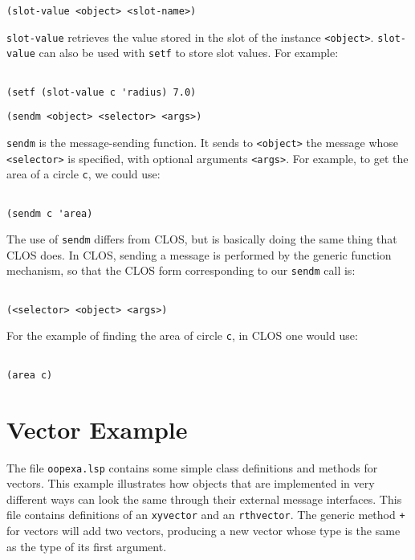 \vspace{.3in}

\begin{verbatim}
(slot-value <object> <slot-name>)
\end{verbatim}
{\tt slot-value} retrieves the value stored in the slot {\tt <slot-name>} of
the instance {\tt <object>}.  {\tt slot-value} can also be used with {\tt setf}
to store slot values.  For example:
\begin{verbatim}

(setf (slot-value c 'radius) 7.0)
\end{verbatim}

\vspace{.3in}

\begin{verbatim}
(sendm <object> <selector> <args>)
\end{verbatim}
{\tt sendm} is the message-sending function.  It sends to {\tt <object>} the
message whose {\tt <selector>} is specified, with optional arguments
{\tt <args>}.
For example, to get the area of a circle {\tt c}, we could use:
\begin{verbatim}

(sendm c 'area)
\end{verbatim}
The use of {\tt sendm} differs from CLOS, but is basically doing the same
thing that CLOS does.  In CLOS, sending a message is performed by the generic
function mechanism, so that the CLOS form corresponding to our {\tt sendm}
call is:
\begin{verbatim}

(<selector> <object> <args>)
\end{verbatim}
For the example of finding the area of circle {\tt c}, in CLOS one would use:

\begin{verbatim}

(area c)
\end{verbatim}

\section{Vector Example}

The file {\tt oopexa.lsp} contains some simple class definitions and methods
for vectors.  This example illustrates how objects that are implemented in
very different ways can look the same through their external message
interfaces.  This file contains definitions of an {\tt xyvector} and an
{\tt rthvector}.  The generic method {\tt +} for vectors will add two vectors,
producing a new vector whose type is the same as the type of its first
argument.

